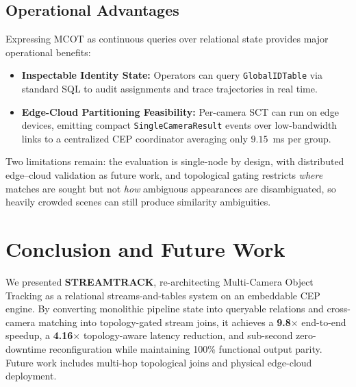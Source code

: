 \documentclass[conference]{IEEEtran}
\begin{document}
\subsection{Operational Advantages}
Expressing MCOT as continuous queries over relational state provides major operational benefits:
\begin{itemize}
    \item \textbf{Inspectable Identity State:} Operators can query \texttt{GlobalIDTable} via standard SQL to audit assignments and trace trajectories in real time.
    \item \textbf{Edge-Cloud Partitioning Feasibility:} Per-camera SCT can run on edge devices, emitting compact \texttt{SingleCameraResult} events over low-bandwidth links to a centralized CEP coordinator averaging only $9.15$~ms per group.
\end{itemize}

Two limitations remain: the evaluation is single-node by design, with distributed edge--cloud validation as future work, and topological gating restricts \emph{where} matches are sought but not \emph{how} ambiguous appearances are disambiguated, so heavily crowded scenes can still produce similarity ambiguities.

\section{Conclusion and Future Work}
\label{sec:conclusion}
We presented \textbf{STREAMTRACK}, re-architecting Multi-Camera Object Tracking as a relational streams-and-tables system on an embeddable CEP engine. By converting monolithic pipeline state into queryable relations and cross-camera matching into topology-gated stream joins, it achieves a \textbf{9.8$\times$} end-to-end speedup, a \textbf{4.16$\times$} topology-aware latency reduction, and sub-second zero-downtime reconfiguration while maintaining 100\% functional output parity. Future work includes multi-hop topological joins and physical edge-cloud deployment.

{\footnotesize


}
\end{document}
